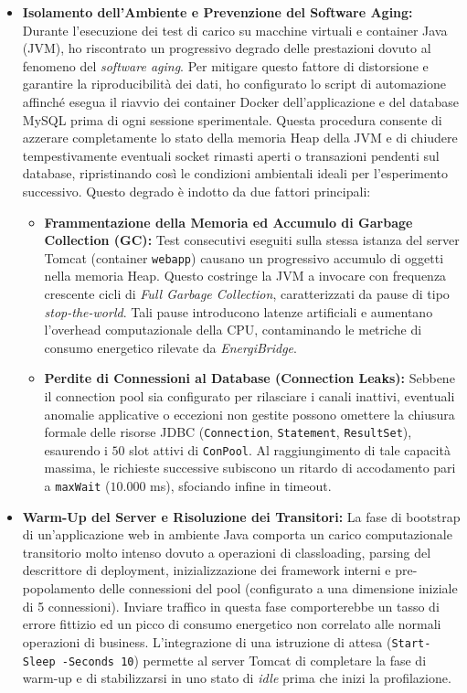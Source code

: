 \begin{itemize}
    \item \textbf{Isolamento dell'Ambiente e Prevenzione del Software Aging:} Durante l'esecuzione dei test di carico su macchine virtuali e container Java (JVM), ho riscontrato un progressivo degrado delle prestazioni dovuto al fenomeno del \textit{software aging}. Per mitigare questo fattore di distorsione e garantire la riproducibilità dei dati, ho configurato lo script di automazione affinché esegua il riavvio dei container Docker dell'applicazione e del database MySQL prima di ogni sessione sperimentale. Questa procedura consente di azzerare completamente lo stato della memoria Heap della JVM e di chiudere tempestivamente eventuali socket rimasti aperti o transazioni pendenti sul database, ripristinando così le condizioni ambientali ideali per l'esperimento successivo. Questo degrado è indotto da due fattori principali:
    \begin{itemize}
        \item \textbf{Frammentazione della Memoria ed Accumulo di Garbage Collection (GC):} Test consecutivi eseguiti sulla stessa istanza del server Tomcat (container \texttt{webapp}) causano un progressivo accumulo di oggetti nella memoria Heap. Questo costringe la JVM a invocare con frequenza crescente cicli di \textit{Full Garbage Collection}, caratterizzati da pause di tipo \textit{stop-the-world}. Tali pause introducono latenze artificiali e aumentano l'overhead computazionale della CPU, contaminando le metriche di consumo energetico rilevate da \textit{EnergiBridge}.
        \item \textbf{Perdite di Connessioni al Database (Connection Leaks):} Sebbene il connection pool sia configurato per rilasciare i canali inattivi, eventuali anomalie applicative o eccezioni non gestite possono omettere la chiusura formale delle risorse JDBC (\texttt{Connection}, \texttt{Statement}, \texttt{ResultSet}), esaurendo i $50$ slot attivi di \texttt{ConPool}. Al raggiungimento di tale capacità massima, le richieste successive subiscono un ritardo di accodamento pari a \texttt{maxWait} ($10.000$ ms), sfociando infine in timeout.
    \end{itemize}
    
    \item \textbf{Warm-Up del Server e Risoluzione dei Transitori:} La fase di bootstrap di un'applicazione web in ambiente Java comporta un carico computazionale transitorio molto intenso dovuto a operazioni di classloading, parsing del descrittore di deployment, inizializzazione dei framework interni e pre-popolamento delle connessioni del pool (configurato a una dimensione iniziale di 5 connessioni). Inviare traffico in questa fase comporterebbe un tasso di errore fittizio ed un picco di consumo energetico non correlato alle normali operazioni di business. L'integrazione di una istruzione di attesa (\texttt{Start-Sleep -Seconds 10}) permette al server Tomcat di completare la fase di warm-up e di stabilizzarsi in uno stato di \textit{idle} prima che inizi la profilazione.
    

\end{itemize}
